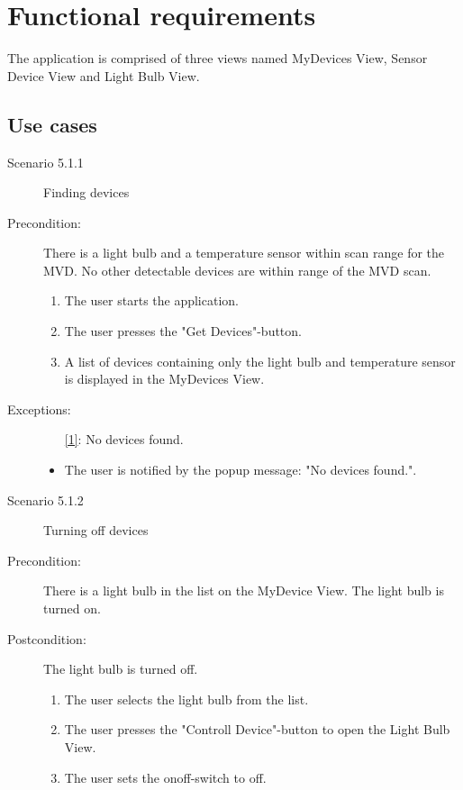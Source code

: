 \documentclass[a4paper]{article}
\begin{document}
\section{Functional requirements}

The application is comprised of three views named MyDevices View, Sensor Device View and Light Bulb View. 

\subsection{Use cases}
\begin{description}
\item[Scenario 5.1.1] Finding devices
\item[Precondition:] There is a light bulb and a temperature sensor within scan range for the MVD. No other detectable devices are within range of the MVD scan.
\begin{enumerate}
\item The user starts the application.
\item The user presses the "Get Devices"-button.
\item \label{1} A list of devices containing only the light bulb and temperature sensor is displayed in the MyDevices View.
\end{enumerate}

\item[Exceptions:]
\begin{itemize}
\item [\ref{1}:] No devices found.
\item The user is notified by the popup message: "No devices found.".
\end{itemize}

\item[]

\item[Scenario 5.1.2] Turning off devices
\item[Precondition:] There is a light bulb in the list on the MyDevice View. The light bulb is turned on.
\item[Postcondition:] The light bulb is turned off.
\begin{enumerate}
\item The user selects the light bulb from the list.
\item \label{2} The user presses the "Controll Device"-button to open the Light Bulb View.
\item  The user sets the onoff-switch to off.
\end{enumerate}


\end{description}
\end{document}
